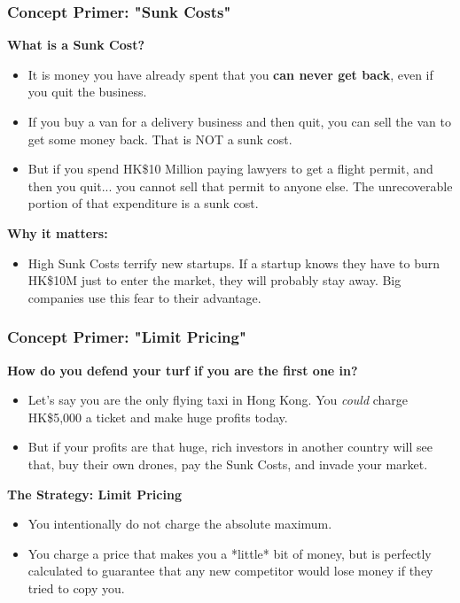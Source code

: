\documentclass{beamer}
\begin{document}
\begin{frame}[t]
  \frametitle{Concept Primer: "Sunk Costs"}
  
  \textbf{What is a Sunk Cost?}
  \begin{itemize}
      \item It is money you have already spent that you \textbf{can never get back}, even if you quit the business.
      \item If you buy a van for a delivery business and then quit, you can sell the van to get some money back. That is NOT a sunk cost.
      \item But if you spend HK\$10 Million paying lawyers to get a flight permit, and then you quit... you cannot sell that permit to anyone else. The unrecoverable portion of that expenditure is a sunk cost.
  \end{itemize}

  \vspace{0.3cm}
  \textbf{Why it matters:}
  \begin{itemize}
      \item High Sunk Costs terrify new startups. If a startup knows they have to burn HK\$10M just to enter the market, they will probably stay away. Big companies use this fear to their advantage.
  \end{itemize}
\end{frame}

\begin{frame}[t]
  \frametitle{Concept Primer: "Limit Pricing"}
  
  \textbf{How do you defend your turf if you are the first one in?}
  \begin{itemize}
      \item Let's say you are the only flying taxi in Hong Kong. You \textit{could} charge HK\$5,000 a ticket and make huge profits today.
      \item But if your profits are that huge, rich investors in another country will see that, buy their own drones, pay the Sunk Costs, and invade your market.
  \end{itemize}

  \vspace{0.3cm}
  \textbf{The Strategy: Limit Pricing}
  \begin{itemize}
      \item You intentionally do not charge the absolute maximum. 
      \item You charge a price that makes you a *little* bit of money, but is perfectly calculated to guarantee that any new competitor would lose money if they tried to copy you. 
  \end{itemize}
\end{frame}
\end{document}
